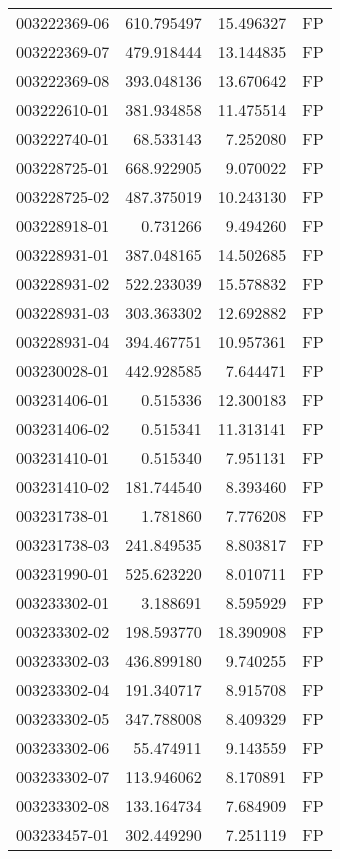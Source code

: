 \begin{tabular}{lrrl}
003222369-06 &  610.795497 &    15.496327 &   FP \\
003222369-07 &  479.918444 &    13.144835 &   FP \\
003222369-08 &  393.048136 &    13.670642 &   FP \\
003222610-01 &  381.934858 &    11.475514 &   FP \\
003222740-01 &   68.533143 &     7.252080 &   FP \\
003228725-01 &  668.922905 &     9.070022 &   FP \\
003228725-02 &  487.375019 &    10.243130 &   FP \\
003228918-01 &    0.731266 &     9.494260 &   FP \\
003228931-01 &  387.048165 &    14.502685 &   FP \\
003228931-02 &  522.233039 &    15.578832 &   FP \\
003228931-03 &  303.363302 &    12.692882 &   FP \\
003228931-04 &  394.467751 &    10.957361 &   FP \\
003230028-01 &  442.928585 &     7.644471 &   FP \\
003231406-01 &    0.515336 &    12.300183 &   FP \\
003231406-02 &    0.515341 &    11.313141 &   FP \\
003231410-01 &    0.515340 &     7.951131 &   FP \\
003231410-02 &  181.744540 &     8.393460 &   FP \\
003231738-01 &    1.781860 &     7.776208 &   FP \\
003231738-03 &  241.849535 &     8.803817 &   FP \\
003231990-01 &  525.623220 &     8.010711 &   FP \\
003233302-01 &    3.188691 &     8.595929 &   FP \\
003233302-02 &  198.593770 &    18.390908 &   FP \\
003233302-03 &  436.899180 &     9.740255 &   FP \\
003233302-04 &  191.340717 &     8.915708 &   FP \\
003233302-05 &  347.788008 &     8.409329 &   FP \\
003233302-06 &   55.474911 &     9.143559 &   FP \\
003233302-07 &  113.946062 &     8.170891 &   FP \\
003233302-08 &  133.164734 &     7.684909 &   FP \\
003233457-01 &  302.449290 &     7.251119 &   FP \\

\end{tabular}
